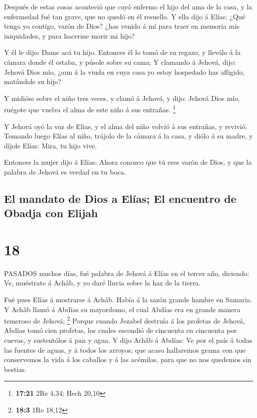  Después de estas cosas aconteció que cayó enfermo el hijo
del ama de la casa, y la enfermedad fué tan grave, que no quedó en él
resuello.  Y ella dijo á Elías: ¿Qué tengo yo contigo,
varón de Dios? ¿has venido á mí para traer en memoria mis iniquidades, y
para hacerme morir mi hijo?

 Y él le dijo: Dame acá tu hijo. Entonces él lo tomó de su
regazo, y llevólo á la cámara donde él estaba, y púsole sobre su cama;
 Y clamando á Jehová, dijo: Jehová Dios mío, ¿aun á la
viuda en cuya casa yo estoy hospedado has afligido, matándole su hijo?

 Y midióse sobre el niño tres veces, y clamó á Jehová, y
dijo: Jehová Dios mío, ruégote que vuelva el alma de este niño á sus
entrañas. \footnote{\textbf{17:21} 2Re 4,34; Hech 20,10}

 Y Jehová oyó la voz de Elías, y el alma del niño volvió á
sus entrañas, y revivió.  Tomando luego Elías al niño,
trájolo de la cámara á la casa, y diólo á su madre, y díjole Elías:
Mira, tu hijo vive.

 Entonces la mujer dijo á Elías: Ahora conozco que tú eres
varón de Dios, y que la palabra de Jehová es verdad en tu boca.

\hypertarget{el-mandato-de-dios-a-eluxedas-el-encuentro-de-obadja-con-elijah}{%
\subsection{El mandato de Dios a Elías; El encuentro de Obadja con
Elijah}\label{el-mandato-de-dios-a-eluxedas-el-encuentro-de-obadja-con-elijah}}

\hypertarget{section-17}{%
\section{18}\label{section-17}}

 PASADOS muchos días, fué palabra de Jehová á Elías en el
tercer año, diciendo: Ve, muéstrate á Achâb, y yo daré lluvia sobre la
haz de la tierra.

 Fué pues Elías á mostrarse á Achâb. Había á la sazón grande
hambre en Samaria.  Y Achâb llamó á Abdías su mayordomo, el
cual Abdías era en grande manera temeroso de Jehová; \footnote{\textbf{18:3}
  1Re 18,12}  Porque cuando Jezabel destruía á los profetas
de Jehová, Abdías tomó cien profetas, los cuales escondió de cincuenta
en cincuenta por cuevas, y sustentólos á pan y agua.  Y dijo
Achâb á Abdías: Ve por el país á todas las fuentes de aguas, y á todos
los arroyos; que acaso hallaremos grama con que conservemos la vida á
los caballos y á las acémilas, para que no nos quedemos sin bestias.

